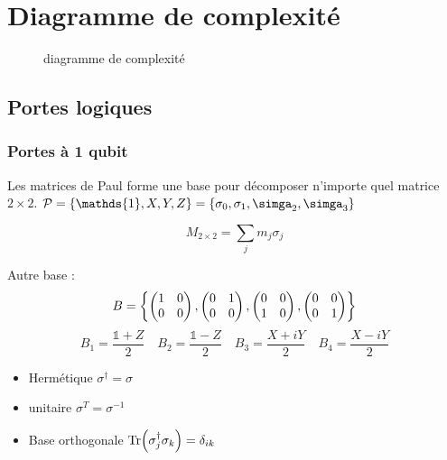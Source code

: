 


\section*{Diagramme de complexité}


\begin{figure}[ht]
    \centering
    \caption{diagramme de complexité}
    \label{fig:diagramme-de-complexité}
\end{figure}

\setcounter{section}{2}
\setcounter{subsection}{4}

\subsection{Portes logiques}

\subsubsection{Portes à 1 qubit}

Les matrices de Paul forme une base pour décomposer n'importe 	quel matrice $2 \times  2$. $\mathcal{P} = \{ \mathds{1}, X, Y, Z \} = \{ \sigma_0 , \sigma_1 , \simga_2 , \simga_3 \}  $ 

$$\boxed{M_{2 \times  2} = \sum_j m_j \sigma_j  }$$ 


\begin{tcolorbox}[title=Démonstration de la complétude]
	Autre base : $$B=\left\{ \begin{pmatrix} 1&0\\0&0 \end{pmatrix}, \begin{pmatrix} 0&1 \\ 0&0 \end{pmatrix},\begin{pmatrix} 0&0\\1&0 \end{pmatrix}, \begin{pmatrix} 0&0\\0&1 \end{pmatrix} \right\} $$  
	$$B_1 = \frac{\mathds{1}+Z}{2}\quad B_2 = \frac{\mathds{1}-Z}{2}\quad B_3 = \frac{X+iY}{2}\quad B_4 = \frac{X-iY}{2} $$ 
\end{tcolorbox}

\begin{tcolorbox}[title=Propriétés de $\mathcal{P} $ ]
	\begin{itemize}
		\item Hermétique $\sigma^{\dagger}=\sigma$
		\item unitaire $\sigma^{T}= \sigma^{-1}$
	\item Base orthogonale $\Tr(\sigma_j^\dagger\sigma_{k}) = \delta_{ik} $
	\end{itemize}
	 
\end{tcolorbox}

